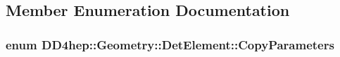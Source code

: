 \subsection{Member Enumeration Documentation}
\hypertarget{class_d_d4hep_1_1_geometry_1_1_det_element_a7a6c7f35568ec9e910ec981fa866362e}{
\subsubsection[{CopyParameters}]{\setlength{\rightskip}{0pt plus 5cm}enum {\bf DD4hep::Geometry::DetElement::CopyParameters}}}
\label{class_d_d4hep_1_1_geometry_1_1_det_element_a7a6c7f35568ec9e910ec981fa866362e}
